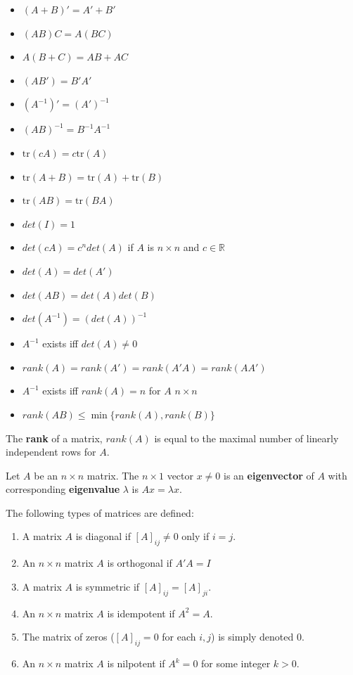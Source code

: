 \documentclass[12pt,]{book}
\providecommand{\tightlist}{%
  \setlength{\itemsep}{0pt}\setlength{\parskip}{0pt}}
\begin{document}
\begin{itemize}
\tightlist
\item
  \((A+B)' =A'+B'\)
\item
  \((AB)C = A(BC)\)
\item
  \(A(B+C) = AB+AC\)
\item
  \((AB') = B'A'\)
\item
  \((A^{-1})' = (A')^{-1}\)
\item
  \((AB)^{-1} = B^{-1}A^{-1}\)
\item
  \(\text{tr}(cA) = c\text{tr}(A)\)
\item
  \(\text{tr}(A+B) = \text{tr}(A) + \text{tr}(B)\)
\item
  \(\text{tr}(AB) =\text{tr}(BA)\)
\item
  \(det(I)=1\)
\item
  \(det(cA) = c^ndet(A)\) if \(A\) is \(n \times n\) and \(c \in \mathbb R\)
\item
  \(det(A) = det(A')\)
\item
  \(det(AB) = det(A)det(B)\)
\item
  \(det(A^{-1}) = (det(A))^{-1}\)
\item
  \(A^{-1}\) exists iff \(det(A) \neq 0\)
\item
  \(rank(A) = rank(A') = rank(A'A) = rank(AA')\)
\item
  \(A^{-1}\) exists iff \(rank(A)=n\) for \(A\) \(n \times n\)
\item
  \(rank(AB) \leq \min \{ rank(A), rank(B) \}\)
\end{itemize}

The \textbf{rank} of a matrix, \(rank(A)\) is equal to the maximal number of linearly independent rows for \(A\).

Let \(A\) be an \(n \times n\) matrix. The \(n \times 1\) vector \(x \neq 0\) is an \textbf{eigenvector} of \(A\) with corresponding \textbf{eigenvalue} \(\lambda\) is \(Ax = \lambda x\).

The following types of matrices are defined:

\begin{enumerate}
\def\labelenumi{\arabic{enumi}.}
\tightlist
\item
  A matrix \(A\) is diagonal if \([A]_ {ij} \neq 0\) only if \(i=j\).
\item
  An \(n \times n\) matrix \(A\) is orthogonal if \(A'A = I\)
\item
  A matrix \(A\) is symmetric if \([A]_ {ij} = [A]_ {ji}\).
\item
  An \(n \times n\) matrix \(A\) is idempotent if \(A^2=A\).
\item
  The matrix of zeros (\([A]_ {ij} =0\) for each \(i,j\)) is simply denoted 0.
\item
  An \(n \times n\) matrix \(A\) is nilpotent if \(A^k=0\) for some integer \(k>0\).
\end{enumerate}
\end{document}

